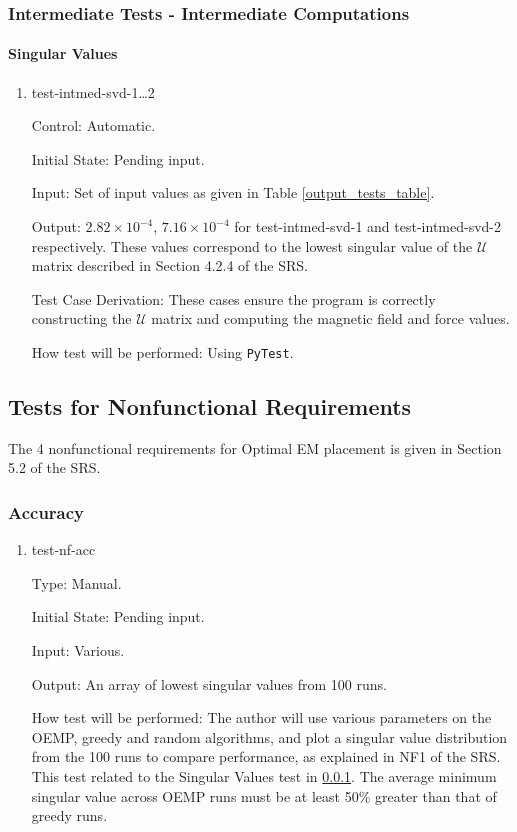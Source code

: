 \documentclass[12pt, titlepage]{article}
\begin{document}
\subsubsection{Intermediate Tests - Intermediate Computations} \label{svd_test}
\paragraph{Singular Values}

\begin{enumerate}

  \item{test-intmed-svd-1\dots2\\} 
  
  Control: Automatic.
            
  Initial State: Pending input.
            
  Input: Set of input values as given in Table \ref{output_tests_table}.
            
  Output: $2.82 \times 10^{-4}$, $7.16 \times 10^{-4}$ for test-intmed-svd-1 and test-intmed-svd-2 respectively. These values correspond to the lowest singular value of the $\mathcal{U}$ matrix described in Section 4.2.4 of the SRS.
  
  Test Case Derivation: These cases ensure the program is correctly constructing the $\mathcal{U}$ matrix and computing the magnetic field and force values. 
            
  How test will be performed: Using \texttt{PyTest}. 
\end{enumerate}

\subsection{Tests for Nonfunctional Requirements}
The 4 nonfunctional requirements for Optimal EM placement is given in Section 5.2 of the SRS. 
\subsubsection{Accuracy}
\begin{enumerate}

\item{test-nf-acc\\}

Type: Manual.
					
Initial State: Pending input.
					
Input: Various.
					
Output: An array of lowest singular values from 100 runs.
					
How test will be performed: The author will use various parameters on the OEMP, greedy and random algorithms, and plot a singular value distribution from the 100 runs to compare performance, as explained in NF1 of the SRS. This test related to the Singular Values test in \ref{svd_test}. The average minimum singular value across OEMP runs must be at least 50\% greater than that of greedy runs. 
\end{enumerate}
\end{document}
